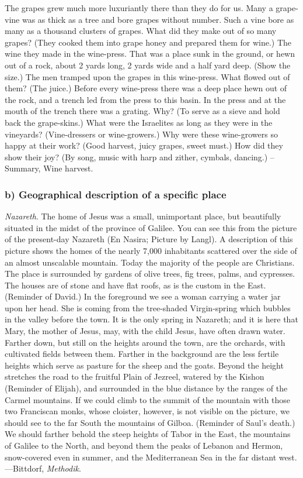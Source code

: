 The grapes grew much more luxuriantly there than they do for us. Many a grape-vine was as thick as a tree and bore grapes without number. Such a vine bore as many as a thousand clusters of grapes. What did they make out of so many grapes? (They cooked them into grape honey and prepared them for wine.) The wine they made in the wine-press. That was a place sunk in the ground, or hewn out of a rock, about 2 yards long, 2 yards wide and a half yard deep. (Show the size.) The men tramped upon the grapes in this wine-press. What flowed out of them? (The juice.) Before every wine-press there was a deep place hewn out of the rock, and a trench led from the press to this basin. In the press and at the mouth of the trench there was a grating. Why? (To serve as a sieve and hold back the grape-skins.) What were the Israelites as long as they were in the vineyards? (Vine-dressers or wine-growers.) Why were these wine-growers so happy at their work? (Good harvest, juicy grapes, sweet must.) How did they show their joy? (By song, music with harp and zither, cymbals, dancing.) --Summary, Wine harvest.

\subsubsection{b) Geographical description of a specific place}

\emph{Nazareth}. The home of Jesus was a small, unimportant place, but beautifully situated in the midst of the province of Galilee. You can see this from the picture of the present-day Nazareth (En Nasira; Picture by Langl). A description of this picture shows the homes of the nearly 7,000 inhabitants scattered over the side of an almost unscalable mountain. Today the majority of the people are Christians. The place is surrounded by gardens of olive trees, fig trees, palms, and cypresses. The houses are of stone and have flat roofs, as is the custom in the East. (Reminder of David.) In the foreground we see a woman carrying a water jar upon her head. She is coming from the tree-shaded Virgin-spring which bubbles in the valley before the town. It is the only spring in Nazareth; and it is here that Mary, the mother of Jesus, may, with the child Jesus, have often drawn water. Farther down, but still on the heights around the town, are the orchards, with cultivated fields between them. Farther in the background are the less fertile heights which serve as pasture for the sheep and the goats. Beyond the height stretches the road to the fruitful Plain of Jezreel, watered by the Kishon (Reminder of Elijah), and surrounded in the blue distance by the ranges of the Carmel mountains. If we could climb to the summit of the mountain with those two Franciscan monks, whose
cloister, however, is not visible on the picture, we should see to the far South the mountains of Gilboa. (Reminder of Saul’s death.) We should farther behold the steep heights of Tabor in the East, the mountains of Galilee to the North, and beyond them the peaks of Lebanon and Hermon, snow-covered even in summer, and the Mediterranean Sea in the far distant west.—Bittdorf, \emph{Methodik}.

